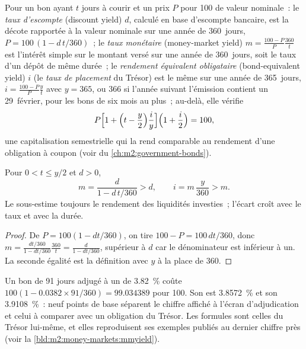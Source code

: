\begin{definition}\label{def:m2:money-markets:yields}
Pour un bon ayant $t$ jours à courir et un prix $P$ pour 100 de valeur nominale~:
le \emph{taux d'escompte} (discount yield) $d$, calculé en base d'escompte bancaire, est
la décote rapportée à la valeur nominale sur une année de 360~jours,
$P = 100\,(1 - d\,t/360)$~; le \emph{taux monétaire}
(money-market yield) $m = \frac{100 - P}{P}\frac{360}{t}$ est l'intérêt simple sur le montant
versé sur une année de 360~jours, soit le taux d'un dépôt de même durée~; le
\emph{rendement équivalent obligataire} (bond-equivalent yield) $i$ (le
\emph{taux de placement} du Trésor) est le même sur une année de 365~jours, $i = \frac{100 -
P}{P}\frac{y}{t}$ avec $y = 365$, ou 366 si l'année suivant l'émission contient un
29~février, pour les bons de six mois au plus~; au-delà, elle vérifie
\[
P\Bigl[1 + \Bigl(t - \frac y2\Bigr)\frac{i}{y}\Bigr]\Bigl(1 + \frac i2\Bigr) = 100,
\]
une capitalisation semestrielle qui la rend comparable au rendement d'une
obligation à coupon (voir du \cref{ch:m2:government-bonds}).
\end{definition}

\begin{proposition}\label{prop:m2:money-markets:order}
Pour $0 < t \le y/2$ et $d > 0$,
\[
m = \frac{d}{1 - d\,t/360} > d, \qquad i = m\,\frac{y}{360} > m .
\]
Le  sous-estime toujours le rendement des liquidités investies~; l'écart
croît avec le taux et avec la durée.
\end{proposition}
\begin{proof}
De $P = 100(1 - dt/360)$, on tire $100 - P = 100\,dt/360$, donc $m = \frac{dt/360}{1 -
dt/360}\frac{360}{t} = \frac{d}{1 - dt/360}$, supérieur à $d$ car le
dénominateur est inférieur à un. La seconde égalité est la définition avec $y$ à la
place de 360.
\end{proof}

\begin{example}\label{ex:m2:money-markets:13w}
Un bon de 91 jours adjugé à un  de 3.82~\% coûte
$100(1 - 0.0382 \times 91/360) = 99.034389$ pour 100. Son  est
3.8572~\% et son  3.9108~\%~: neuf points de base séparent
le chiffre affiché à l'écran d'adjudication et celui à comparer avec un
obligation du Trésor. Les formules sont celles du Trésor lui-même, et elles reproduisent ses
exemples publiés au dernier chiffre près (voir la \cref{bld:m2:money-markets:mmyield}).
\end{example}


